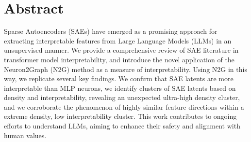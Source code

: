 \section*{Abstract}

Sparse Autoencoders (SAEs) have emerged as a promising approach for extracting interpretable features from Large Language Models (LLMs) in an unsupervised manner.
We provide a comprehensive review of SAE literature in transformer model interpretability, and introduce the novel application of the Neuron2Graph (N2G) method as a measure of interpretability.
Using N2G in this way, we replicate several key findings.
We confirm that SAE latents are more interpretable than MLP neurons, we identify clusters of SAE latents based on density and interpretability, revealing an unexpected ultra-high density cluster, and we corroborate the phenomenon of highly similar feature directions within a extreme density, low interpretability cluster.
This work contributes to ongoing efforts to understand LLMs, aiming to enhance their safety and alignment with human values.
